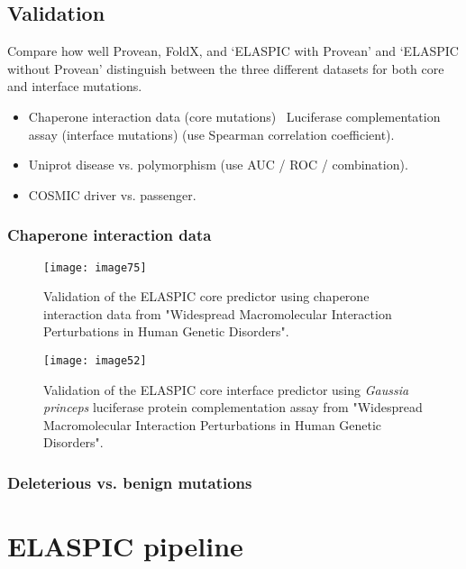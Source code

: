 \subsection{Validation}

Compare how well Provean, FoldX, and `ELASPIC with Provean' and `ELASPIC without Provean' distinguish between the three different datasets for both core and interface mutations.

\begin{itemize}
\item Chaperone interaction data (core mutations) \ Luciferase complementation assay (interface mutations) (use Spearman correlation coefficient).
\item Uniprot disease vs. polymorphism (use AUC / ROC / combination).
\item COSMIC driver vs. passenger.
\end{itemize}







\subsubsection{Chaperone interaction data}

\begin{figure}[H]
	\centering
	\texttt{[image: image75]}
	\caption[Core Validation]{Validation of the ELASPIC core predictor using chaperone interaction data from "Widespread Macromolecular Interaction Perturbations in Human Genetic Disorders".}
\end{figure}


\begin{figure}[H]
	\centering
	\texttt{[image: image52]}
	\caption[Interface Validation]{Validation of the ELASPIC core interface predictor using \textit{Gaussia princeps} luciferase protein complementation assay from "Widespread Macromolecular Interaction Perturbations in Human Genetic Disorders".}
\end{figure}




\subsubsection{Deleterious vs. benign mutations}






\section{ELASPIC pipeline}


